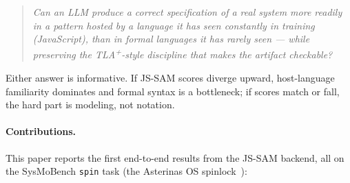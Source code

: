 \documentclass[11pt]{article}
\newcommand{\jssam}{JS-SAM}
\newcommand{\tlaplus}{TLA\texorpdfstring{\textsuperscript{+}}{+}}
\begin{document}
\begin{quote}
\emph{Can an LLM produce a correct specification of a real system more readily
in a pattern hosted by a language it has seen constantly in training
(JavaScript), than in formal languages it has rarely seen --- while preserving
the \tlaplus{}-style discipline that makes the artifact checkable?}
\end{quote}

Either answer is informative. If \jssam{} scores diverge upward, host-language
familiarity dominates and formal syntax is a bottleneck; if scores match or
fall, the hard part is modeling, not notation.

\paragraph{Contributions.}
This paper reports the first end-to-end results from the \jssam{} backend,
all on the SysMoBench \texttt{spin} task (the Asterinas OS
spinlock~\cite{asterinas}):
\end{document}
